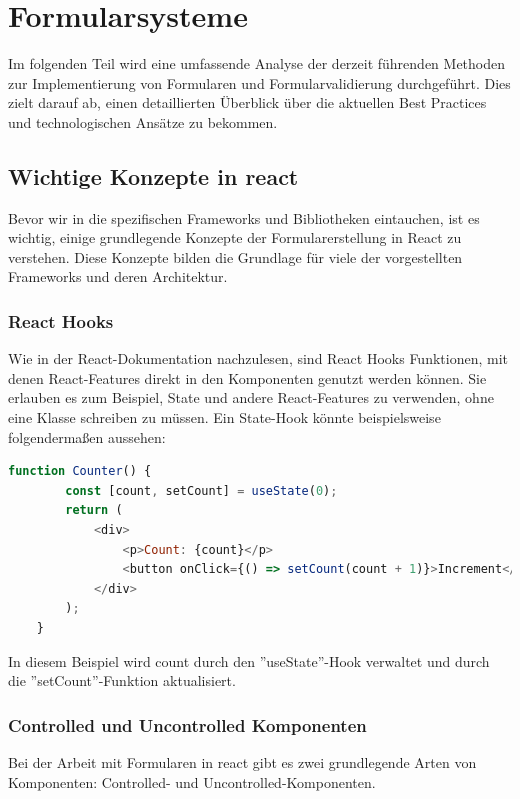 
\section{Formularsysteme}

    Im folgenden Teil wird eine umfassende Analyse der derzeit führenden Methoden zur Implementierung von Formularen und Formularvalidierung durchgeführt. Dies zielt darauf ab, einen detaillierten Überblick über die aktuellen Best Practices und technologischen Ansätze zu bekommen.\cite{prompt10_pollak}

    \subsection{Wichtige Konzepte in \gls{react}}
    Bevor wir in die spezifischen Frameworks und Bibliotheken eintauchen, ist es wichtig, einige grundlegende Konzepte der Formularerstellung in React zu verstehen. Diese Konzepte bilden die Grundlage für viele der vorgestellten Frameworks und deren Architektur.
    
        \subsubsection{React Hooks\label{sec:ReactHooks}}
        Wie in der React-Dokumentation \cite{reacthooks} nachzulesen, sind React Hooks Funktionen, mit denen React-Features direkt in den Komponenten genutzt werden können. Sie erlauben es zum Beispiel, State und andere React-Features zu verwenden, ohne eine Klasse schreiben zu müssen. Ein State-Hook könnte beispielsweise folgendermaßen aussehen:
    
        \begin{lstlisting}[language=JavaScript]
    function Counter() { 
        const [count, setCount] = useState(0); 
        return (
            <div>
                <p>Count: {count}</p> 
                <button onClick={() => setCount(count + 1)}>Increment</button>  
            </div>
        );
    }
        \end{lstlisting}
        In diesem Beispiel wird count durch den ''useState''-Hook verwaltet und durch die ''setCount''-Funktion aktualisiert.

        \subsubsection{Controlled und Uncontrolled Komponenten}
        Bei der Arbeit mit Formularen in \gls{react} gibt es zwei grundlegende Arten von Komponenten: Controlled- und Uncontrolled-Komponenten.
        
